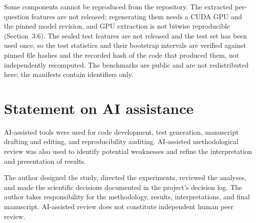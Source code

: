 Some components cannot be reproduced from the repository. The extracted per-question features are not released; regenerating them needs a CUDA GPU and the pinned model revision, and GPU extraction is not bitwise reproducible (Section~3.6). The sealed test features are not released and the test set has been used once, so the test statistics and their bootstrap intervals are verified against pinned file hashes and the recorded hash of the code that produced them, not independently recomputed. The benchmarks are public and are not redistributed here; the manifests contain identifiers only.

\section*{Statement on AI assistance}
AI-assisted tools were used for code development, test generation, manuscript drafting and editing, and reproducibility auditing. AI-assisted methodological review was also used to identify potential weaknesses and refine the interpretation and presentation of results.

The author designed the study, directed the experiments, reviewed the analyses, and made the scientific decisions documented in the project's decision log. The author takes responsibility for the methodology, results, interpretations, and final manuscript. AI-assisted review does not constitute independent human peer review.
